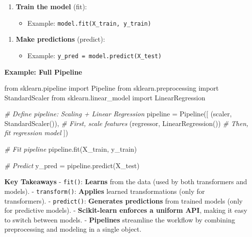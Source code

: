\documentclass{article}
\providecommand{\tightlist}{%
      \setlength{\itemsep}{0pt}\setlength{\parskip}{0pt}}
\newenvironment{Shaded}{}{}
\newcommand{\StringTok}[1]{\textcolor[rgb]{0.25,0.44,0.63}{{#1}}}
\newcommand{\CommentTok}[1]{\textcolor[rgb]{0.38,0.63,0.69}{\textit{{#1}}}}
\newcommand{\NormalTok}[1]{{#1}}
\newcommand{\ImportTok}[1]{{#1}}
\newcommand{\OperatorTok}[1]{\textcolor[rgb]{0.40,0.40,0.40}{{#1}}}
\begin{document}
\begin{enumerate}
\def\labelenumi{\arabic{enumi}.}
\setcounter{enumi}{1}
\tightlist
\item
  \textbf{Train the model} (fit):

  \begin{itemize}
  \tightlist
  \item
    Example: \texttt{model.fit(X\_train,\ y\_train)}
  \end{itemize}
\end{enumerate}

\begin{enumerate}
\def\labelenumi{\arabic{enumi}.}
\setcounter{enumi}{2}
\tightlist
\item
  \textbf{Make predictions} (predict):

  \begin{itemize}
  \tightlist
  \item
    Example: \texttt{y\_pred\ =\ model.predict(X\_test)}
  \end{itemize}
\end{enumerate}

\textbf{Example: Full Pipeline}

\begin{Shaded}
\begin{Highlighting}[]
\ImportTok{from}\NormalTok{ sklearn.pipeline }\ImportTok{import}\NormalTok{ Pipeline}
\ImportTok{from}\NormalTok{ sklearn.preprocessing }\ImportTok{import}\NormalTok{ StandardScaler}
\ImportTok{from}\NormalTok{ sklearn.linear\_model }\ImportTok{import}\NormalTok{ LinearRegression}

\CommentTok{\# Define pipeline: Scaling + Linear Regression}
\NormalTok{pipeline }\OperatorTok{=}\NormalTok{ Pipeline([}
\NormalTok{    (}\StringTok{\textquotesingle{}scaler\textquotesingle{}}\NormalTok{, StandardScaler()),  }\CommentTok{\# First, scale features}
\NormalTok{    (}\StringTok{\textquotesingle{}regressor\textquotesingle{}}\NormalTok{, LinearRegression())  }\CommentTok{\# Then, fit regression model}
\NormalTok{])}

\CommentTok{\# Fit pipeline}
\NormalTok{pipeline.fit(X\_train, y\_train)}

\CommentTok{\# Predict}
\NormalTok{y\_pred }\OperatorTok{=}\NormalTok{ pipeline.predict(X\_test)}
\end{Highlighting}
\end{Shaded}

\textbf{Key Takeaways} - \texttt{fit()}: \textbf{Learns} from the data
(used by both transformers and models). - \texttt{transform()}:
\textbf{Applies} learned transformations (only for transformers). -
\texttt{predict()}: \textbf{Generates predictions} from trained models
(only for predictive models). - \textbf{Scikit-learn enforces a uniform
API}, making it easy to switch between models. - \textbf{Pipelines}
streamline the workflow by combining preprocessing and modeling in a
single object.
\end{document}
